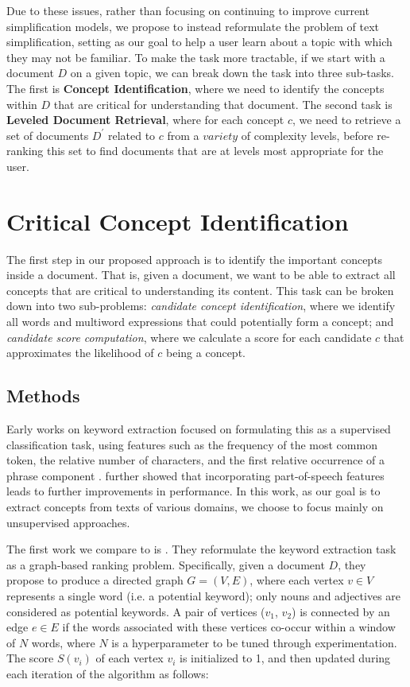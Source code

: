 \documentclass[thesis.tex]{subfiles}
\begin{document}
Due to these issues, rather than focusing on continuing to improve current simplification models, we propose to instead reformulate the problem of text simplification, setting as our goal to help a user learn about a topic with which they may not be familiar. To make the task more tractable, if we start with a document $D$ on a given topic, we can break down the task into three sub-tasks. The first is \textbf{Concept Identification}, where we need to identify the concepts within $D$ that are critical for understanding that document. The second task is \textbf{Leveled Document Retrieval}, where for each concept $c$, we need to retrieve a set of documents $D^{\prime}$ related to $c$ from a $variety$ of complexity levels, before re-ranking this set to find documents that are at levels most appropriate for the user.

\section{Critical Concept Identification} \label{sec:concept}

The first step in our proposed approach is to identify the important concepts inside a document. That is, given a document, we want to be able to extract all concepts that are critical to understanding its content. This task can be broken down into two sub-problems: \textit{candidate concept identification}, where we identify all words and multiword expressions that could potentially form a concept; and \textit{candidate score computation}, where we calculate a score for each candidate $c$ that approximates the likelihood of $c$ being a concept.

\subsection{Methods}

Early works on keyword extraction focused on formulating this as a supervised classification task, using features such as the frequency of the most common token, the relative number of characters, and the first relative occurrence of a phrase component \citep{turney2000learning}. \cite{hulth2003improved} further showed that incorporating part-of-speech features leads to further improvements in performance. In this work, as our goal is to extract concepts from texts of various domains, we choose to focus mainly on unsupervised approaches.

The first work we compare to is \cite{mihalcea2004textrank}. They reformulate the keyword extraction task as a graph-based ranking problem. Specifically, given a document $D$, they propose to produce a directed graph $G = (V, E)$, where each vertex $v \in V$ represents a single word (i.e. a potential keyword); only nouns and adjectives are considered as potential keywords. A pair of vertices ($v_1$, $v_2$) is connected by an edge $e \in E$ if the words associated with these vertices co-occur within a window of $N$ words, where $N$ is a hyperparameter to be tuned through experimentation. The score $S(v_i)$ of each vertex $v_i$ is initialized to 1, and then updated during each iteration of the algorithm as follows:
\end{document}
